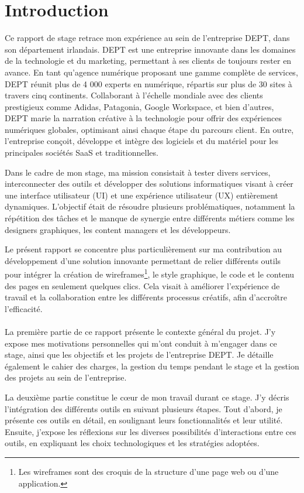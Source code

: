 \chapter{Introduction}
Ce rapport de stage retrace mon expérience au sein de l'entreprise DEPT, dans son département irlandais. DEPT est une entreprise innovante dans les domaines de la technologie et du marketing, permettant à ses clients de toujours rester en avance. En tant qu'agence numérique proposant une gamme complète de services, DEPT réunit plus de 4 000 experts en numérique, répartis sur plus de 30 sites à travers cinq continents. Collaborant à l'échelle mondiale avec des clients prestigieux comme Adidas, Patagonia, Google Workspace, et bien d'autres, DEPT marie la narration créative à la technologie pour offrir des expériences numériques globales, optimisant ainsi chaque étape du parcours client. En outre, l'entreprise conçoit, développe et intègre des logiciels et du matériel pour les principales sociétés SaaS et traditionnelles.

Dans le cadre de mon stage, ma mission consistait à tester divers services, interconnecter des outils et développer des solutions informatiques visant à créer une interface utilisateur (UI) et une expérience utilisateur (UX) entièrement dynamiques. L'objectif était de résoudre plusieurs problématiques, notamment la répétition des tâches et le manque de synergie entre différents métiers comme les designers graphiques, les content managers et les développeurs.

Le présent rapport se concentre plus particulièrement sur ma contribution au développement d'une solution innovante permettant de relier différents outils pour intégrer la création de wireframes\footnote{Les wireframes sont des croquis de la structure d'une page web ou d'une application.}, le style graphique, le code et le contenu des pages en seulement quelques clics. Cela visait à améliorer l'expérience de travail et la collaboration entre les différents processus créatifs, afin d'accroître l'efficacité.
\\ \\
La première partie de ce rapport présente le contexte général du projet. J'y expose mes motivations personnelles qui m'ont conduit à m'engager dans ce stage, ainsi que les objectifs et les projets de l'entreprise DEPT. Je détaille également le cahier des charges, la gestion du temps pendant le stage et la gestion des projets au sein de l'entreprise.


La deuxième partie constitue le cœur de mon travail durant ce stage. J'y décris l'intégration des différents outils en suivant plusieurs étapes. Tout d'abord, je présente ces outils en détail, en soulignant leurs fonctionnalités et leur utilité. Ensuite, j'expose les réflexions sur les diverses possibilités d'interactions entre ces outils, en expliquant les choix technologiques et les stratégies adoptées.

